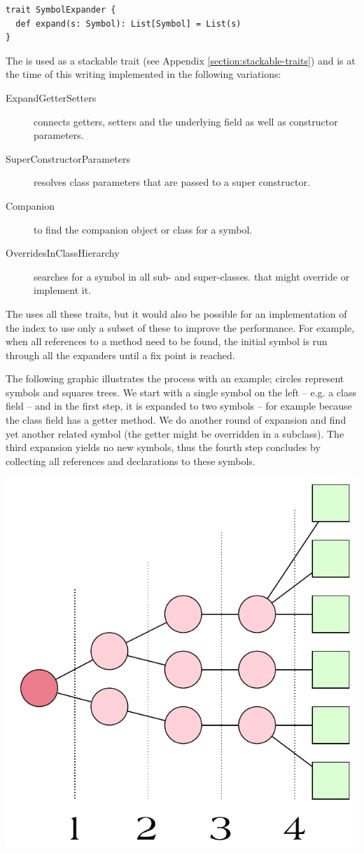 \begin{lstlisting}
trait SymbolExpander {
  def expand(s: Symbol): List[Symbol] = List(s)
}
\end{lstlisting}

The  is used as a stackable trait (see Appendix \vref{section:stackable-traits}) and is at the time of this writing implemented in the following variations:

\begin{description}
 \item[ExpandGetterSetters] connects getters, setters and the underlying field as well as constructor parameters.
 \item[SuperConstructorParameters] resolves class parameters that are passed to a super constructor.
 \item[Companion] to find the companion object or class for a symbol.
 \item[OverridesInClassHierarchy] searches for a symbol in all sub- and super-classes. that might override or implement it.
\end{description}

The  uses all these traits, but it would also be possible for an implementation of the index to use only a subset of these to improve the performance. For example, when all references to a method need to be found, the initial symbol is run through all the expanders until a fix point is reached.

The following graphic illustrates the process with an example; circles represent symbols and squares trees. We start with a single symbol on the left -- e.g. a class field -- and in the first step, it is expanded to two symbols -- for example because the class field has a getter method. We do another round of expansion and find yet another related symbol (the getter might be overridden in a subclass). The third expansion yields no new symbols, thus the fourth step concludes by collecting all references and declarations to these symbols.

\begin{center}
\includegraphics[width=0.5\linewidth]{expanding_symbols.pdf}
\end{center}

